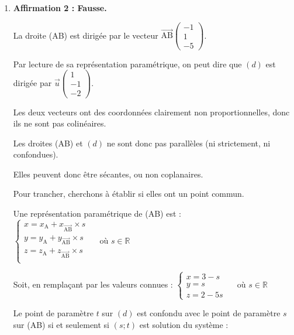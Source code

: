 \documentclass[10pt]{article}
\providecommand{\R}{\mathbb{R}}
\providecommand{\vect}[1]{\overrightarrow{#1}}
\providecommand{\vectt}[1]{\overrightarrow{\mathrm{#1}}}
\begin{document}
\begin{enumerate}
\begin{enumerate}
			I est donc un point du plan $(\mathcal{P})$.

			Le plan $(\mathcal{P})$ est bien orthogonal à la droite (AB), et passe par le milieu du segment [AB]

			(autrement dit, c'est le plan médiateur du segment [AB]).

			\item \textbf{Affirmation 2 : Fausse.}

			La droite (AB) est dirigée par le vecteur $\vectt{AB} \begin{pmatrix} -1\\1\\-5 \end{pmatrix} $.

			Par lecture de sa représentation paramétrique, on peut dire que $(d)$ est dirigée par $\vect{u}\begin{pmatrix} 1\\-1\\-2 \end{pmatrix}$.

			Les deux vecteurs ont des coordonnées clairement non proportionnelles, donc ils ne sont pas colinéaires.

			Les droites (AB) et $(d)$ ne sont donc pas parallèles (ni strictement, ni confondues).

			Elles peuvent donc être sécantes, ou non coplanaires.

			Pour trancher, cherchons à établir si elles ont un point commun.

			Une représentation paramétrique de (AB) est :\quad $\begin{cases}
				x = x_{\mathrm{A}} + x_{\vectt{AB}}\times s\\
				y = y_{\mathrm{A}} + y_{\vectt{AB}}\times s\\
				z = z_{\mathrm{A}} + z_{\vectt{AB}}\times s\\
			\end{cases}\quad \text{ où } s \in \R$

			Soit, en remplaçant par les valeurs connues : \quad $\begin{cases}
				x = 3 - s\\ y = s \\ z = 2 - 5s
			\end{cases}\quad \text{ où } s \in \R$

			Le point de paramètre $t$ sur $(d)$ est confondu avec le point de paramètre $s$ sur (AB) si et seulement si $(s ; t)$ est solution du système :


\end{enumerate}
\end{enumerate}
\end{document}
